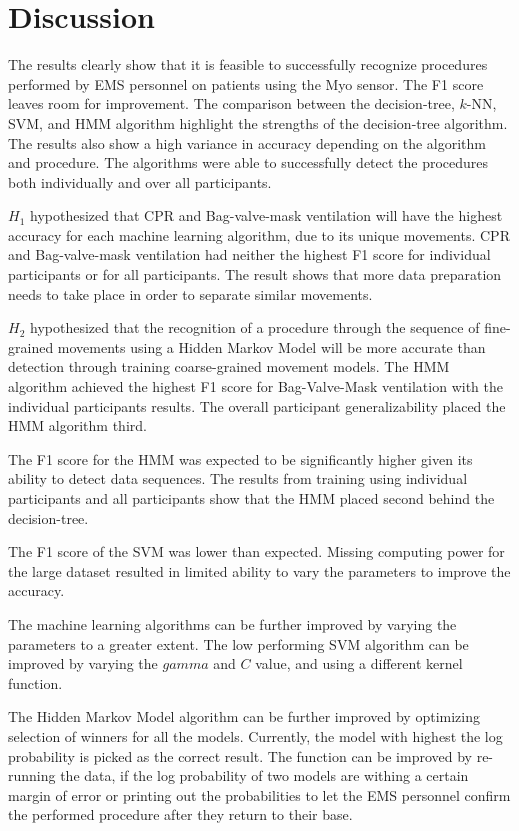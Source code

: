 \section{Discussion}
\label{sec:Results:Discussion}
The results clearly show that it is feasible to successfully recognize procedures performed by EMS personnel on patients using the Myo sensor. The F1 score leaves room for improvement. The comparison between the decision-tree, $k$-NN, SVM, and HMM algorithm highlight the strengths of the decision-tree algorithm. The results also show a high variance in accuracy depending on the algorithm and procedure. The algorithms were able to successfully detect the procedures both individually and over all participants.
\par $H_1$ hypothesized that CPR and Bag-valve-mask ventilation will have the highest accuracy for each machine learning algorithm, due to its unique movements. CPR and Bag-valve-mask ventilation had neither the highest F1 score for individual participants or for all participants. The result shows that more data preparation needs to take place in order to separate similar movements. 
\par $H_2$ hypothesized that the recognition of a procedure through the sequence of fine-grained movements using a Hidden Markov Model will be more accurate than detection through training coarse-grained movement models. The HMM algorithm achieved the highest F1 score for Bag-Valve-Mask ventilation with the individual participants results. The overall participant generalizability placed the HMM algorithm third.
\par The F1 score for the HMM was expected to be significantly higher given its ability to detect data sequences. The results from training using individual participants and all participants show that the HMM placed second behind the decision-tree.
\par The F1 score of the SVM was lower than expected. Missing computing power for the large dataset resulted in limited ability to vary the parameters to improve the accuracy. 
\par The machine learning algorithms can be further improved by varying the parameters to a greater extent. The low performing SVM algorithm can be improved by varying the $gamma$ and $C$ value, and using a different kernel function.
\par The Hidden Markov Model algorithm can be further improved by optimizing selection of winners for all the models. Currently, the model with highest the log probability is picked as the correct result. The function can be improved by re-running the data, if the log probability of two models are withing a certain margin of error or printing out the probabilities to let the EMS personnel confirm the performed procedure after they return to their base.
